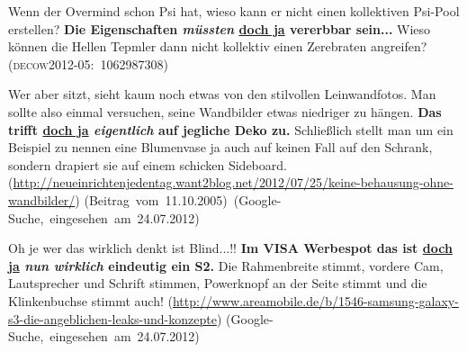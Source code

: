 \begin{exe}
	\ex\label{389}

	Wenn der Overmind schon Psi hat, wieso kann er nicht einen kollektiven Psi-Pool erstellen? \textbf{Die Eigenschaften \textit{müssten} \underline{doch 		ja} vererbbar sein...} Wieso können die Hellen Tepmler dann nicht kollektiv einen Zerebraten angreifen?                                               
	\hfill\hbox{\scshape(decow2012-05: 1062987308)}	
\end{exe}
	
\begin{exe}
	\ex\label{390}

	Wer aber sitzt, sieht kaum noch etwas von den stilvollen Leinwandfotos. Man sollte also einmal versuchen, seine Wandbilder etwas niedriger zu hängen. 		\textbf{Das trifft \underline{doch ja} \textit{eigentlich} auf jegliche Deko zu.} Schließlich stellt man um ein Beispiel zu nennen eine Blumenvase ja 		auch auf keinen Fall auf den Schrank, sondern drapiert sie auf einem schicken Sideboard. 
	\newline
	{\scriptsize(\url{http://neueinrichtenjedentag.want2blog.net/2012/07/25/keine-behausung-ohne-wandbilder/})}
	\newline
	\hbox{}\hfill\hbox{(Beitrag vom 11.10.2005) (Google-Suche, eingesehen am 24.07.2012)}
\end{exe}	
	
\begin{exe}
	\ex\label{391}

	Oh je wer das wirklich denkt ist Blind...!!
	\textbf{Im VISA Werbespot das ist \underline{doch ja} \textit{nun wirklich} eindeutig ein S2.}
	Die Rahmenbreite stimmt, vordere Cam, Lautsprecher und Schrift stimmen, Powerknopf an der Seite stimmt und die Klinkenbuchse stimmt auch!
	\newline
	{\scriptsize(\url{http://www.areamobile.de/b/1546-samsung-galaxy-s3-die-angeblichen-leaks-und-konzepte})}
	\newline
	\hbox{}\hfill\hbox{(Google-Suche, eingesehen am 24.07.2012)}
\end{exe}						
							               	
